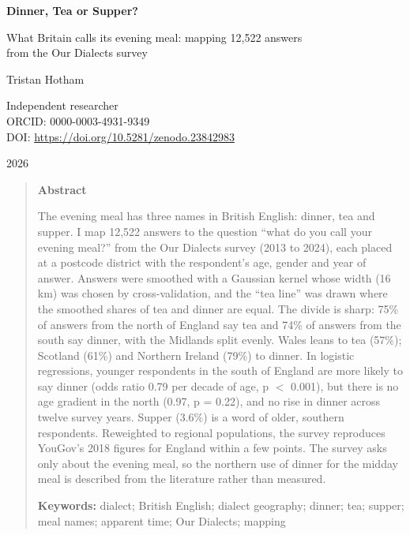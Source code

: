 \documentclass[11pt,a4paper]{article}
\begin{document}
\begin{center}
{\Large\bfseries Dinner, Tea or Supper?\par}
\vspace{0.4em}
{\large What Britain calls its evening meal: mapping 12,522 answers\\from the Our Dialects survey\par}
\vspace{1.2em}
{\large Tristan Hotham\par}
\vspace{0.3em}
{\small Independent researcher\\
ORCID: 0000-0003-4931-9349\\
DOI: \href{https://doi.org/10.5281/zenodo.23842983}{https://doi.org/10.5281/zenodo.23842983}\par}
\vspace{0.8em}
2026
\end{center}

\begin{quote}
\small
\begin{center}\textbf{Abstract}\end{center}
The evening meal has three names in British English: dinner, tea and supper. I map 12,522 answers to the question ``what do you call your evening meal?'' from the Our Dialects survey (2013 to 2024), each placed at a postcode district with the respondent's age, gender and year of answer. Answers were smoothed with a Gaussian kernel whose width (16 km) was chosen by cross-validation, and the ``tea line'' was drawn where the smoothed shares of tea and dinner are equal. The divide is sharp: 75\% of answers from the north of England say tea and 74\% of answers from the south say dinner, with the Midlands split evenly. Wales leans to tea (57\%); Scotland (61\%) and Northern Ireland (79\%) to dinner. In logistic regressions, younger respondents in the south of England are more likely to say dinner (odds ratio 0.79 per decade of age, p $<$ 0.001), but there is no age gradient in the north (0.97, p = 0.22), and no rise in dinner across twelve survey years. Supper (3.6\%) is a word of older, southern respondents. Reweighted to regional populations, the survey reproduces YouGov's 2018 figures for England within a few points. The survey asks only about the evening meal, so the northern use of dinner for the midday meal is described from the literature rather than measured.

\textbf{Keywords:} dialect; British English; dialect geography; dinner; tea; supper; meal names; apparent time; Our Dialects; mapping
\end{quote}
\end{document}
